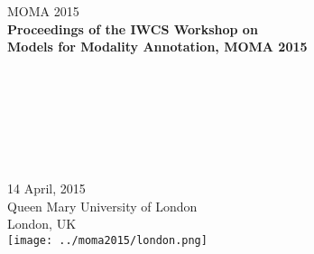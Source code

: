 \documentclass[11pt]{article}
\begin{document}
  \begin{center}
  \LARGE MOMA 2015 \\
  \vspace*{55mm}
    {\bf
    \LARGE
    Proceedings of the IWCS 
    Workshop on \\ Models for Modality Annotation, MOMA 2015\\ \hspace*{1cm}\\ \hspace*{1cm} \\ \vspace*{-1cm}
    \hspace*{1cm} \\ \hspace*{1cm}\\
    \hspace*{1cm}\\
    \vspace{2cm}
    \LARGE
    ~\\
    \vspace{2cm}
    \hspace*{1cm}} \\ %
    \vspace{33mm}
    \LARGE
    14 April, 2015 \\
    Queen Mary University of London\\
    London, UK \\
    
    \noindent
    \texttt{[image: ../moma2015/london.png]}
    
  \end{center}
\end{document}
